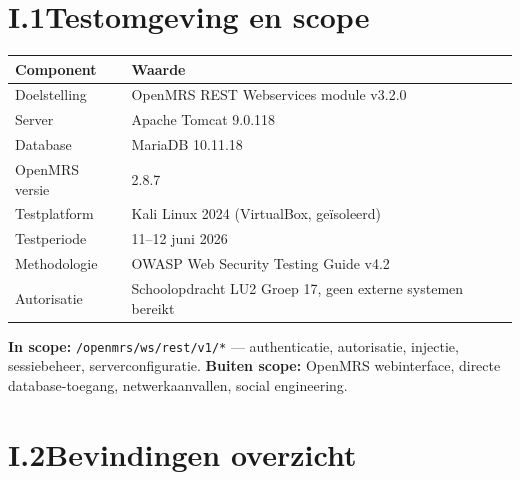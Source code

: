 \documentclass[12pt, a4paper]{report}
\begin{document}
\section*{I.1\quad Testomgeving en scope}

\begin{tabular}{@{}ll@{}}
\toprule
\textbf{Component} & \textbf{Waarde} \\
\midrule
Doelstelling & OpenMRS REST Webservices module v3.2.0 \\
Server & Apache Tomcat 9.0.118 \\
Database & MariaDB 10.11.18 \\
OpenMRS versie & 2.8.7 \\
Testplatform & Kali Linux 2024 (VirtualBox, geïsoleerd) \\
Testperiode & 11--12 juni 2026 \\
Methodologie & OWASP Web Security Testing Guide v4.2 \\
Autorisatie & Schoolopdracht LU2 Groep 17, geen externe systemen bereikt \\
\bottomrule
\end{tabular}

\medskip

\textbf{In scope:} \texttt{/openmrs/ws/rest/v1/*} --- authenticatie, autorisatie,
injectie, sessiebeheer, serverconfiguratie.
\textbf{Buiten scope:} OpenMRS webinterface, directe database-toegang,
netwerkaanvallen, social engineering.

\section*{I.2\quad Bevindingen overzicht}
\end{document}
